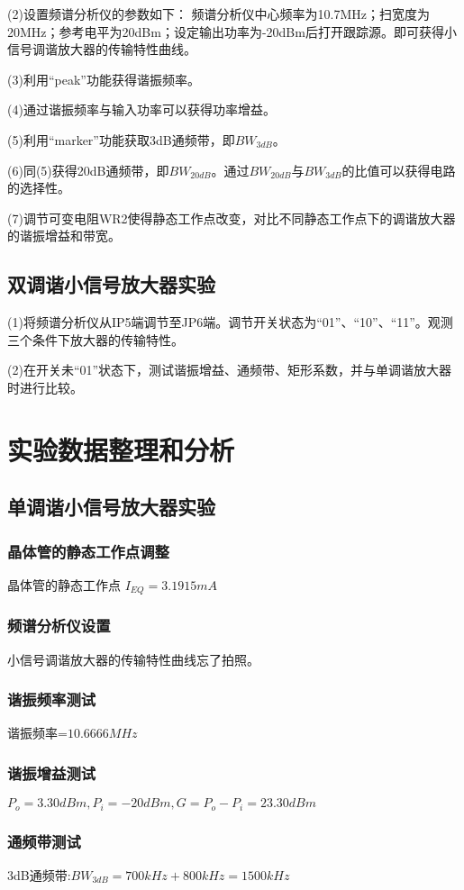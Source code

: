 \documentclass{../source/zjureport}
\begin{document}
	(2)设置频谱分析仪的参数如下：
	频谱分析仪中心频率为10.7MHz；扫宽度为20MHz；参考电平为20dBm；设定输出功率为-20dBm后打开跟踪源。即可获得小信号调谐放大器的传输特性曲线。
	
	
	(3)利用“peak”功能获得谐振频率。
	
	(4)通过谐振频率与输入功率可以获得功率增益。
	
	(5)利用“marker”功能获取3dB通频带，即$BW_{3dB}$。
	
	(6)同(5)获得20dB通频带，即$BW_{20dB}$。通过$BW_{20dB}$与$BW_{3dB}$的比值可以获得电路的选择性。
	
	(7)调节可变电阻WR2使得静态工作点改变，对比不同静态工作点下的调谐放大器的谐振增益和带宽。
	
	\subsection{双调谐小信号放大器实验}
    (1)将频谱分析仪从IP5端调节至JP6端。调节开关状态为“01”、“10”、“11”。观测三个条件下放大器的传输特性。
    
    (2)在开关未“01”状态下，测试谐振增益、通频带、矩形系数，并与单调谐放大器时进行比较。
	
	\section{实验数据整理和分析}
	\subsection{单调谐小信号放大器实验}
	\subsubsection{晶体管的静态工作点调整}
	晶体管的静态工作点 $I_{EQ} = 3.1915mA$
	\subsubsection{频谱分析仪设置}
	小信号调谐放大器的传输特性曲线忘了拍照。
	\subsubsection{谐振频率测试}
	谐振频率=$10.6666MHz$
	\subsubsection{谐振增益测试}
	$P_o = 3.30dBm,P_i=-20dBm,G=P_o-P_i = 23.30dBm$
	\subsubsection{通频带测试}
	3dB通频带:$BW_{3dB}=700kHz+800kHz=1500kHz$
\end{document}
